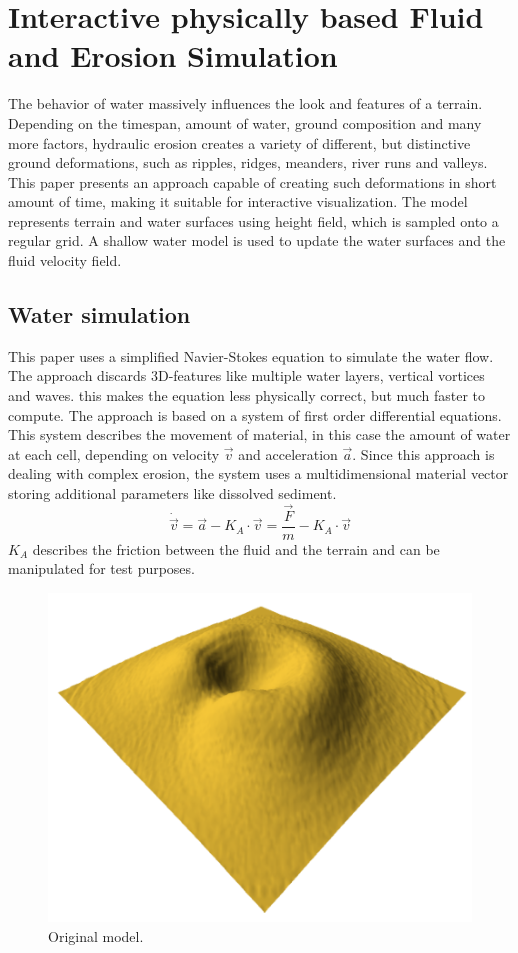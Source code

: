 \section{Interactive physically based Fluid and Erosion Simulation}

The behavior of water massively influences the look and features of a terrain. Depending on the timespan, amount of water, ground composition and many more factors, hydraulic erosion creates a variety of different, but distinctive ground deformations, such as ripples, ridges, meanders, river runs and valleys. 
This paper \cite{Neidhold:2005:IPB:2381356.2381361} presents an approach capable of creating such deformations in short amount of time, making it suitable for interactive visualization. The model represents terrain and water surfaces using height field, which is sampled onto a regular grid. A shallow water model is used to update the water surfaces and the fluid velocity field. 

\subsection{Water simulation}
This paper uses a simplified Navier-Stokes equation to simulate the water flow. The approach discards 3D-features like multiple water layers, vertical vortices and waves. this makes the equation less physically correct, but much faster to compute. The approach is based on a system of first order differential equations. This system describes the movement of material, in this case the amount of water at each cell, depending on velocity $\vec{v}$ and acceleration $\vec{a}$. Since this approach is dealing with complex erosion, the system uses a multidimensional material vector storing additional parameters like dissolved sediment.
$$\dot{\vec{v}} = \vec{a} -K_A \cdot \vec{v}=\frac{\vec{F}}{m} - K_A\cdot \vec{v}$$
$K_A$ describes the friction between the fluid and the terrain and can be manipulated for test purposes. 

\begin{figure}
	\centering
	\includegraphics[width=\linewidth]{NWD05/hydraulic_errosion_a}
	\caption{Original model.}
	\label{fig:orig_model}
\end{figure}

